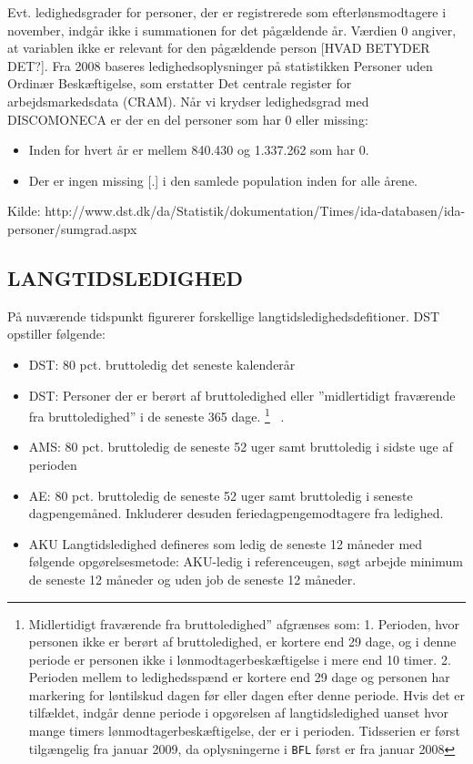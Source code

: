\begin{itemize} [topsep=6pt,itemsep=-1ex]
Evt. ledighedsgrader for personer, der er registrerede som efterlønsmodtagere i november, indgår ikke i summationen for det pågældende år. Værdien 0 angiver, at variablen ikke er relevant for den pågældende person [HVAD BETYDER DET?]. Fra 2008 baseres ledighedsoplysninger på statistikken Personer uden Ordinær Beskæftigelse, som erstatter Det centrale register for arbejdsmarkedsdata (CRAM).
% 
Når vi krydser ledighedsgrad med DISCOMONECA er der en del personer som har 0 eller missing:
% 
\begin{itemize} [topsep=6pt,itemsep=-1ex]
  \item Inden for hvert år er mellem 840.430 og 1.337.262 som har 0.
  \item Der er ingen missing [.] i den samlede population inden for alle årene.
\end{itemize}
%
Kilde: http://www.dst.dk/da/Statistik/dokumentation/Times/ida-databasen/ida-personer/sumgrad.aspx


\subsection{LANGTIDSLEDIGHED \label{}}
%
På nuværende tidspunkt figurerer forskellige langtidsledighedsdefitioner. DST \parencite{Grunnet-Lauridsen2014} opstiller følgende: 
\begin{itemize} [topsep=6pt,itemsep=-1ex]
  \item DST: 80 pct. bruttoledig det seneste kalenderår
  \item DST: Personer der er berørt af bruttoledighed eller ”midlertidigt fraværende fra bruttoledighed” i de seneste 365 dage.%
%
\footnote{Midlertidigt fraværende fra bruttoledighed” afgrænses som: 1. Perioden, hvor personen ikke er berørt af bruttoledighed, er kortere end 29 dage, og i denne periode er personen ikke i lønmodtagerbeskæftigelse i mere end 10 timer. 2. Perioden mellem to ledighedsspænd er kortere end 29 dage og personen har markering for løntilskud dagen før eller dagen efter denne periode. Hvis det er tilfældet, indgår denne periode i opgørelsen af langtidsledighed uanset hvor mange timers lønmodtagerbeskæftigelse, der er i perioden. Tidsserien er først tilgængelig fra januar 2009, da oplysningerne i \texttt{BFL} først er fra januar 2008}%
%
\ .
  \item AMS: 80 pct. bruttoledig de seneste 52 uger samt bruttoledig i sidste uge af perioden
  \item AE: 80 pct. bruttoledig de seneste 52 uger samt bruttoledig i seneste dagpengemåned. Inkluderer desuden feriedagpengemodtagere fra ledighed.
  \item AKU Langtidsledighed defineres som ledig de seneste 12 måneder med følgende opgørelsesmetode: AKU-ledig i referenceugen, søgt arbejde minimum de seneste 12 måneder og uden job de seneste 12 måneder.
\end{itemize}
%


\end{itemize}
